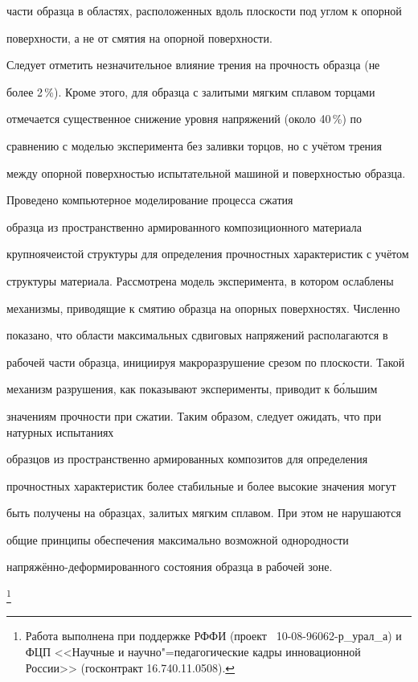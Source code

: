 части образца в областях, расположенных вдоль плоскости под углом к опорной

поверхности, а не от смятия на опорной поверхности.



Следует отметить незначительное влияние трения на прочность образца (не

более 2\,{\%}). Кроме этого, для образца с залитыми мягким сплавом торцами

отмечается существенное снижение уровня напряжений (около 40\,{\%}) по

сравнению с моделью эксперимента без заливки торцов, но с учётом трения

между опорной поверхностью испытательной машиной и поверхностью образца.



\smallskip



 Проведено компьютерное моделирование процесса сжатия

образца из пространственно армированного композиционного материала

крупноячеистой структуры для определения прочностных характеристик с учётом

структуры материала. Рассмотрена модель эксперимента, в котором ослаблены

механизмы, приводящие к смятию образца на опорных поверхностях. Численно

показано, что области максимальных сдвиговых напряжений располагаются в

рабочей части образца, инициируя макроразрушение срезом по плоскости. Такой

механизм разрушения, как показывают эксперименты, приводит к б\'ольшим

значениям прочности при сжатии. Таким образом, следует ожидать, что при натурных испытаниях

образцов из пространственно армированных композитов для определения

прочностных характеристик более стабильные и более высокие значения могут

быть получены на образцах, залитых мягким сплавом. При этом не нарушаются

общие принципы обеспечения максимально возможной однородности

напряжённо-деформированного состояния образца в рабочей зоне.



\thanks{\noindent Работа выполнена при поддержке РФФИ (проект \No~10-08-96062-р{\_}урал{\_}а) и ФЦП <<Научные и научно"=педагогические кадры инновационной России>> (госконтракт 16.740.11.0508). }







